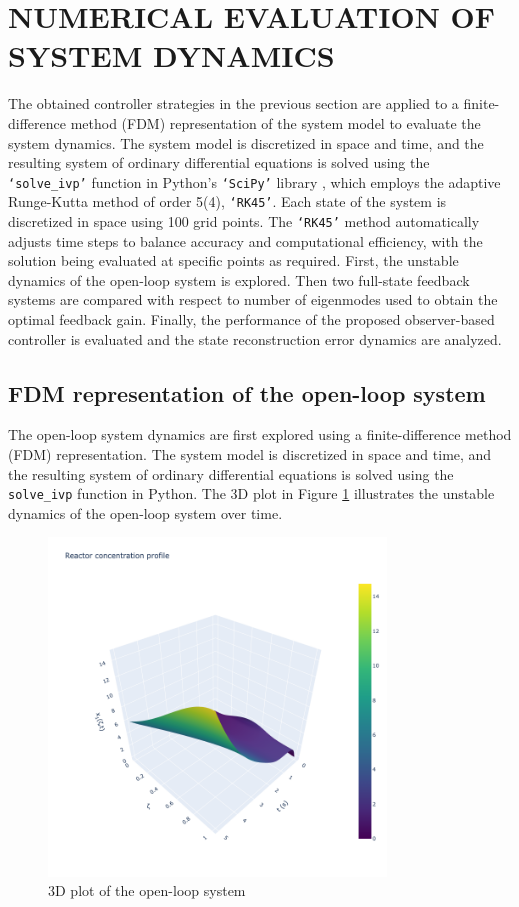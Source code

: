 \section{NUMERICAL EVALUATION OF SYSTEM DYNAMICS}

The obtained controller strategies in the previous section are applied to a finite-difference method (FDM) representation of the system model to evaluate the system dynamics. The system model is discretized in space and time, and the resulting system of ordinary differential equations is solved using the \texttt{`solve\_ivp'} function in Python's \texttt{`SciPy'} library \autocite{2020SciPy}, which employs the adaptive Runge-Kutta method of order 5(4), \texttt{`RK45'}. Each state of the system is discretized in space using 100 grid points. The \texttt{`RK45'} method automatically adjusts time steps to balance accuracy and computational efficiency, with the solution being evaluated at specific points as required. First, the unstable dynamics of the open-loop system is explored. Then two full-state feedback systems are compared with respect to number of eigenmodes used to obtain the optimal feedback gain. Finally, the performance of the proposed observer-based controller is evaluated and the state reconstruction error dynamics are analyzed.

\subsection{FDM representation of the open-loop system}

The open-loop system dynamics are first explored using a finite-difference method (FDM) representation. The system model is discretized in space and time, and the resulting system of ordinary differential equations is solved using the \texttt{solve\_ivp} function in Python. The 3D plot in Figure \ref{fig:3D_x1_openloop} illustrates the unstable dynamics of the open-loop system over time.

\begin{figure}[H]
    \centering
    \includegraphics[width=0.8\textwidth]{Figures/3D_x1_openloop.png}
    \caption{3D plot of the open-loop system}
    \label{fig:3D_x1_openloop}
\end{figure}

